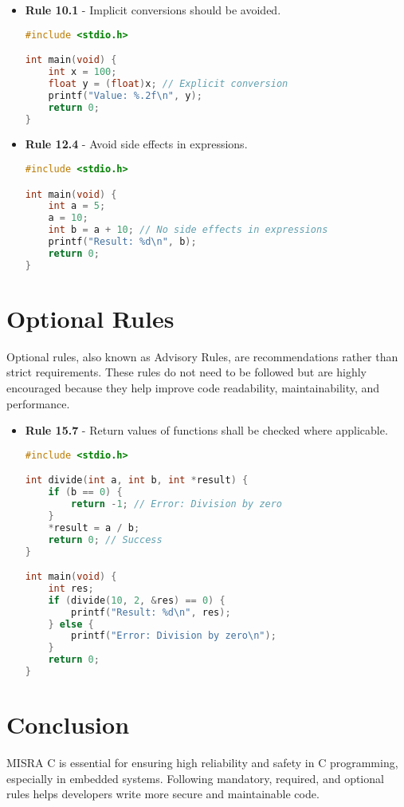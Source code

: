 \documentclass{article}
\begin{document}
\begin{itemize}
    \item \textbf{Rule 10.1} - Implicit conversions should be avoided.
    
    \begin{tcolorbox}[colback=gray!10, colframe=black, sharp corners=southwest]
    \begin{lstlisting}[language=C]
#include <stdio.h>

int main(void) {
    int x = 100;
    float y = (float)x; // Explicit conversion
    printf("Value: %.2f\n", y);
    return 0;
}
    \end{lstlisting}
    \end{tcolorbox}

    \item \textbf{Rule 12.4} - Avoid side effects in expressions.
    
    \begin{tcolorbox}[colback=gray!10, colframe=black, sharp corners=southwest]
    \begin{lstlisting}[language=C]
#include <stdio.h>

int main(void) {
    int a = 5;
    a = 10;
    int b = a + 10; // No side effects in expressions
    printf("Result: %d\n", b);
    return 0;
}
    \end{lstlisting}
    \end{tcolorbox}
\end{itemize}

\section{Optional Rules}
Optional rules, also known as Advisory Rules, are recommendations rather than strict requirements. These rules do not need to be followed but are highly encouraged because they help improve code readability, maintainability, and performance.

\begin{itemize}
    \item \textbf{Rule 15.7} - Return values of functions shall be checked where applicable.
    
    \begin{tcolorbox}[colback=gray!10, colframe=black, sharp corners=southwest]
    \begin{lstlisting}[language=C]
#include <stdio.h>

int divide(int a, int b, int *result) {
    if (b == 0) {
        return -1; // Error: Division by zero
    }
    *result = a / b;
    return 0; // Success
}

int main(void) {
    int res;
    if (divide(10, 2, &res) == 0) {
        printf("Result: %d\n", res);
    } else {
        printf("Error: Division by zero\n");
    }
    return 0;
}
    \end{lstlisting}
    \end{tcolorbox}
\end{itemize}

\section{Conclusion}
MISRA C is essential for ensuring high reliability and safety in C programming, especially in embedded systems. Following mandatory, required, and optional rules helps developers write more secure and maintainable code.
\end{document}
